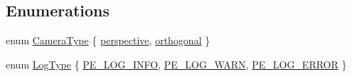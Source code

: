 \subsection*{Enumerations}
\begin{DoxyCompactItemize}
\item 
enum \mbox{\hyperlink{namespacepiolot_a8ffac0a73d973fb66879963da5defc90}{Camera\+Type}} \{ \mbox{\hyperlink{namespacepiolot_a8ffac0a73d973fb66879963da5defc90a2306e17263193ee4e70fe9756faef528}{perspective}}, 
\mbox{\hyperlink{namespacepiolot_a8ffac0a73d973fb66879963da5defc90a13a3f6c076aead69259dbda7be1d234f}{orthogonal}}
 \}
\item 
enum \mbox{\hyperlink{namespacepiolot_a23b501c43e72ecf3dbf1146b2919c3a3}{Log\+Type}} \{ \mbox{\hyperlink{namespacepiolot_a23b501c43e72ecf3dbf1146b2919c3a3af05c0e3d779fea0be15a1edd4814b4d9}{P\+E\+\_\+\+L\+O\+G\+\_\+\+I\+N\+FO}}, 
\mbox{\hyperlink{namespacepiolot_a23b501c43e72ecf3dbf1146b2919c3a3afb1a9e8cf2d19f1e3e4ea4d1f691f565}{P\+E\+\_\+\+L\+O\+G\+\_\+\+W\+A\+RN}}, 
\mbox{\hyperlink{namespacepiolot_a23b501c43e72ecf3dbf1146b2919c3a3a1775698b19471b219a44841e54e60d53}{P\+E\+\_\+\+L\+O\+G\+\_\+\+E\+R\+R\+OR}}
 \}
\end{DoxyCompactItemize}
